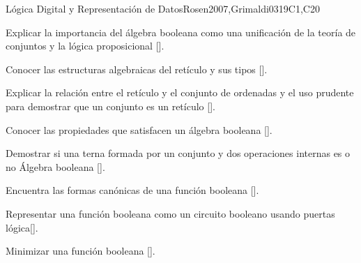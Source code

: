 \begin{syllabus}
\begin{unit}{Lógica Digital y Representación de Datos}{}{Rosen2007,Grimaldi03}{19}{C1,C20}
   \begin{learningoutcomes}
	\item Explicar la importancia del álgebra booleana como una unificación de la teoría de conjuntos y la lógica proposicional [\Assessment].
	\item Conocer las estructuras algebraicas del retículo y sus tipos [\Assessment].
	\item Explicar la relación entre el retículo y el conjunto de ordenadas y el uso prudente para demostrar que un conjunto es un retículo [\Assessment].
	\item Conocer las propiedades que satisfacen un álgebra booleana [\Assessment].
	\item Demostrar si una terna formada por un conjunto y dos operaciones internas es o no Álgebra booleana [\Assessment].
	\item Encuentra las formas canónicas de una función booleana  [\Assessment].
	\item Representar una función booleana como un circuito booleano usando puertas lógica[\Assessment].
	\item Minimizar una función booleana [\Assessment].
    \end{learningoutcomes}
\end{unit}

\begin{coursebibliography}
\end{coursebibliography}

\end{syllabus}

%

